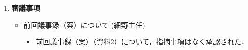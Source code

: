 \documentclass[10.5pt,a4paper]{jsarticle}
\begin{document}
\begin{enumerate}[label=\arabic*：, leftmargin=2zw, labelsep=1zw, itemsep=1\baselineskip]
\begin{itemize}[label=・, leftmargin=1.5zw, itemsep=1\baselineskip]
		\item 各種委員会報告 
		\begin{itemize}[label=-, leftmargin=2zw, nosep]
			\item 委員会（山口教授）
			\begin{itemize}
				\item 予算
				\item 
			\end{itemize}
			
			\item 国際学術委員会（村上准教授）
			\begin{itemize}
				\item これから大学院生を増やすことを考えたときに海外の大学から進学されることを想定し，英語の案内へのURLをつけた
				\item 
			\end{itemize}

			\item 高大連携委員会（福田助教）
			\begin{itemize}
				\item 6名いるうち研究室を希望した3名を希望した研究室の先生へお願いした．残り3名は福田が見る．
				\item 
			\end{itemize}

		\end{itemize}

		\item その他
		\begin{itemize}[label=-, leftmargin=2zw, nosep]
			\item 五味准教授
			\begin{itemize}
				\item メールの添付ファイル非推奨の確認．
			\end{itemize}
			西脇教授
				今年度ゼミ生の募集をやめる

		\end{itemize}

	\end{itemize}


 \item \textbf{審議事項}
	\begin{itemize}[label=・, leftmargin=1.5zw, itemsep=1\baselineskip]%
		\item 前回議事録（案）について (細野主任)
		\begin{itemize}[label=-, leftmargin=2zw, nosep]
			\item 前回議事録（案）（資料2）について，指摘事項はなく承認された．
		\end{itemize}
		

\end{itemize}
\end{enumerate}
\end{document}
